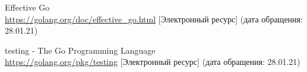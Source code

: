 


\begin{thebibliography}{8}

    Effective Go
    \\\url{https://golang.org/doc/effective_go.html}
    [Электронный ресурс] (дата обращения: 28.01.21)

    testing - The Go Programming Language
    \\\url{https://golang.org/pkg/testing}
    [Электронный ресурс] (дата обращения: 28.01.21)

\end{thebibliography}
